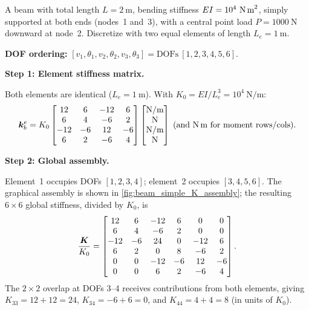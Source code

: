 \begin{example}
\label{ex:beam2}

A beam with total length $L = 2\ \text{m}$, bending stiffness
$EI = 10^4\ \text{N\,m}^2$, simply supported at both ends (nodes~1
and~3), with a central point load $P = 1000\ \text{N}$ downward at
node~2. Discretize with two equal elements of length $L_e = 1\ \text{m}$.

\medskip
\noindent\textbf{DOF ordering:}
$[v_1, \theta_1, v_2, \theta_2, v_3, \theta_3] = \text{DOFs}\ [1,2,3,4,5,6]$.

\medskip
\noindent\textbf{Step 1: Element stiffness matrix.}

Both elements are identical ($L_e = 1\ \text{m}$). With
$K_0 = EI/L_e^3 = 10^4\ \text{N/m}$:
\[
    \bm{k}^e_b = K_0
    \begin{bmatrix}
        12 &  6 & -12 &  6 \\
         6 &  4 &  -6 &  2 \\
       -12 & -6 &  12 & -6 \\
         6 &  2 &  -6 &  4
    \end{bmatrix}
    \begin{bmatrix}
        \text{N/m} \\ \text{N} \\ \text{N/m} \\ \text{N}
    \end{bmatrix}
    \;(\text{and N\,m for moment rows/cols}) .
\]

\medskip
\noindent\textbf{Step 2: Global assembly.}

Element~1 occupies DOFs $[1,2,3,4]$; element~2 occupies $[3,4,5,6]$.
The graphical assembly is shown in \cref{fig:beam_simple_K_assembly};
the resulting $6\times 6$ global stiffness, divided by $K_0$, is
\begin{equation*}
    \frac{\bm{K}}{K_0} =
    \begin{bmatrix}
        12  &  6  & -12 &   6 &   0 &   0 \\
         6  &  4  &  -6 &   2 &   0 &   0 \\
       -12  & -6  &  24 &   0 & -12 &   6 \\
         6  &  2  &   0 &   8 &  -6 &   2 \\
         0  &  0  & -12 &  -6 &  12 &  -6 \\
         0  &  0  &   6 &   2 &  -6 &   4
    \end{bmatrix} .
\end{equation*}
The $2\times2$ overlap at DOFs 3--4 receives contributions from both
elements, giving $K_{33} = 12+12 = 24$, $K_{34} = -6+6 = 0$, and
$K_{44} = 4+4 = 8$ (in units of $K_0$).


\end{example}

